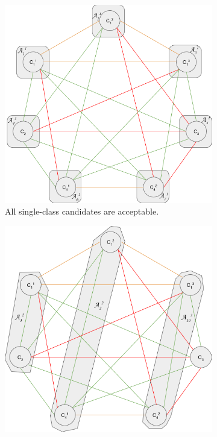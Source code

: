 \begin{figure}
  \label{fig:splittingCtx}
  \def\sfwidth{0.24\textwidth}
  \begin{subfigure}[b]{\sfwidth}
    \includegraphics[width=\textwidth]{img/split-1-class.png}
    \caption{All single-class candidates are acceptable.}
  \end{subfigure}
  \begin{subfigure}[b]{\sfwidth}
    \includegraphics[width=\textwidth]{img/split-2-class_1.png}

\end{subfigure}
\end{figure}

